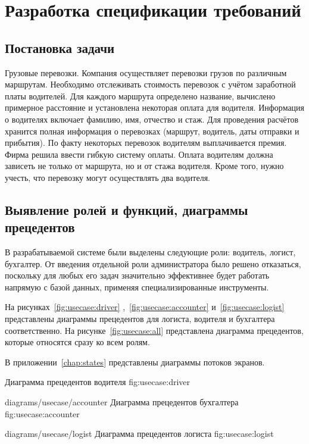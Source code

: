 \chapter{Разработка спецификации требований}
\label{chap:spec}

\section{Постановка задачи}
Грузовые перевозки. Компания осуществляет перевозки грузов 
по различным маршрутам. Необходимо отслеживать стоимость перевозок 
с учётом заработной платы водителей. Для каждого маршрута определено 
название, вычислено примерное расстояние и установлена некоторая оплата 
для водителя. Информация о водителях включает фамилию, имя, отчество и стаж. 
Для проведения расчётов хранится полная информация о перевозках 
(маршрут, водитель, даты отправки и прибытия). По факту некоторых 
перевозок водителям выплачивается премия. Фирма решила ввести гибкую 
систему оплаты. Оплата водителям должна зависеть не только от маршрута, 
но и от стажа водителя. Кроме того, нужно учесть, что перевозку 
могут осуществлять два водителя.

\section{Выявление ролей и функций, диаграммы прецедентов}
В разрабатываемой системе были выделены следующие роли: 
водитель, логист, бухгалтер. 
От введения отдельной роли администратора было решено отказаться, 
поскольку для любых его задач значительно эффективнее будет работать
напрямую с базой данных, применяя специализированные инструменты.

На рисунках~\ref{fig:usecase:driver}
,~\ref{fig:usecase:accounter} 
и~\ref{fig:usecase:logist}~
представлены диаграммы прецедентов для 
логиста, водителя и бухгалтера соответственно. 
На рисунке~\ref{fig:usecase:all} 
представлена диаграмма прецедентов, которые относятся сразу ко всем ролям.

В приложении~\ref{chap:states} представлены диаграммы потоков экранов.

    {Диаграмма прецедентов водителя}
    {fig:usecase:driver}

\image
    {diagrams/usecase/accounter}
    {Диаграмма прецедентов бухгалтера}
    {fig:usecase:accounter}

\image
    {diagrams/usecase/logist}
    {Диаграмма прецедентов логиста}
    {fig:usecase:logist}

